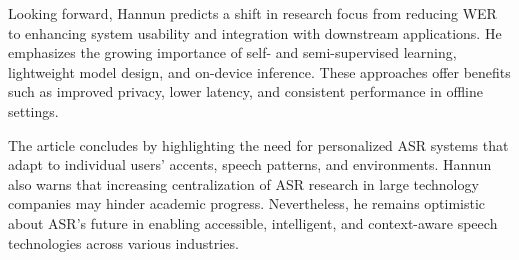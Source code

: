 Looking forward, Hannun predicts a shift in research focus from reducing WER to enhancing system usability and integration with downstream applications. He emphasizes the growing importance of self- and semi-supervised learning, lightweight model design, and on-device inference. These approaches offer benefits such as improved privacy, lower latency, and consistent performance in offline settings.

The article concludes by highlighting the need for personalized ASR systems that adapt to individual users’ accents, speech patterns, and environments. Hannun also warns that increasing centralization of ASR research in large technology companies may hinder academic progress. Nevertheless, he remains optimistic about ASR's future in enabling accessible, intelligent, and context-aware speech technologies across various industries.